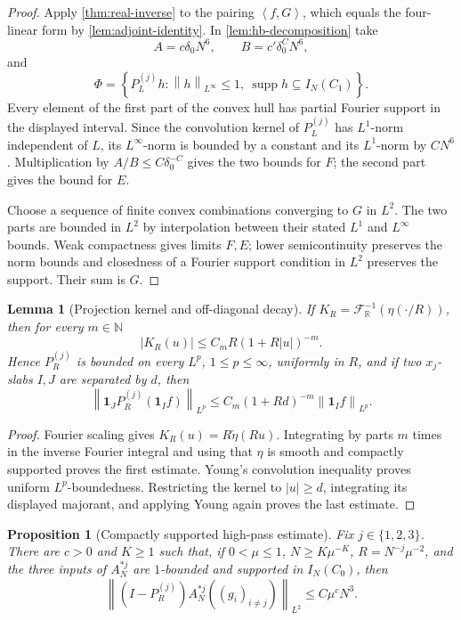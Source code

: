 \documentclass[11pt]{article}
\newtheorem{proposition}[theorem]{Proposition}
\newtheorem{lemma}[theorem]{Lemma}
\newcommand{\R}{\mathbb{R}}
\newcommand{\N}{\mathbb{N}}
\newcommand{\supp}{\operatorname{supp}}
\newcommand{\one}{\mathbf{1}}
\newcommand{\ip}[2]{\left\langle #1,#2\right\rangle}
\newcommand{\norm}[2]{\left\lVert #1\right\rVert_{#2}}
\newcommand{\abs}[1]{\left|#1\right|}
\newcommand{\set}[1]{\left\{#1\right\}}
\newcommand{\indices}{\{1,2,3\}}
\begin{document}
	\begin{proof}
		Apply \cref{thm:real-inverse} to the pairing \(\ip fG\), which equals the four-linear form by \cref{lem:adjoint-identity}.  In
		\cref{lem:hb-decomposition} take
		\[
		A=c\delta_0N^6,\qquad
		B=c'\delta_0^CN^6,
		\]
		and
		\[
		\Phi=\set{P_L^{(j)}h:\norm h{L^\infty}\leq1,\
			\supp h\subseteq I_N(C_1)}.
		\]
		Every element of the first part of the convex hull has partial Fourier support in the displayed interval.  Since the convolution kernel of \(P_L^{(j)}\) has \(L^1\)-norm independent of \(L\), its \(L^\infty\)-norm is bounded by a constant and its \(L^1\)-norm by \(CN^6\).  Multiplication by
		\(A/B\leq C\delta_0^{-C}\) gives the two bounds for \(F\); the second part gives the bound for \(E\).
		
		Choose a sequence of finite convex combinations converging to \(G\) in \(L^2\).  The two parts are bounded in \(L^2\) by interpolation between their stated \(L^1\) and \(L^\infty\) bounds.  Weak compactness gives limits \(F,E\); lower semicontinuity preserves the norm bounds and closedness of a Fourier support condition in \(L^2\) preserves the support.  Their sum is \(G\).
	\end{proof}
	
	\begin{lemma}[Projection kernel and off-diagonal decay]\label{lem:projection-off-diagonal}
		If \(K_R=\mathcal F_\R^{-1}(\eta(\cdot/R))\), then for every \(m\in\N\)
		\[
		\abs{K_R(u)}\leq C_mR(1+R\abs u)^{-m}.
		\]
		Hence \(P_R^{(j)}\) is bounded on every \(L^p\), \(1\leq p\leq\infty\), uniformly in \(R\), and if two \(x_j\)-slabs \(I,J\) are separated by \(d\), then
		\[
		\norm{\one_JP_R^{(j)}(\one_If)}{L^p}
		\leq
		C_m(1+Rd)^{-m}\norm{\one_If}{L^p}.
		\]
	\end{lemma}
	
	\begin{proof}
		Fourier scaling gives \(K_R(u)=R\check\eta(Ru)\).  Integrating by parts \(m\) times in the inverse Fourier integral and using that \(\eta\) is smooth and compactly supported proves the first estimate.  Young's convolution inequality proves uniform \(L^p\)-boundedness.  Restricting the kernel to \(\abs u\geq d\), integrating its displayed majorant, and applying Young again proves the last estimate.
	\end{proof}
	
	\begin{proposition}[Compactly supported high-pass estimate]\label{prop:compact-high-pass}
		Fix \(j\in\indices\).  There are \(c>0\) and \(K\geq1\) such that, if
		\(0<\mu\leq1\), \(N\geq K\mu^{-K}\), \(R=N^{-j}\mu^{-2}\), and the three inputs of \(A_N^{*j}\) are \(1\)-bounded and supported in \(I_N(C_0)\), then
		\[
		\norm{(I-P_R^{(j)})A_N^{*j}((g_i)_{i\neq j})}{L^2}
		\leq C\mu^cN^3.
		\]
	\end{proposition}
	
\end{document}
